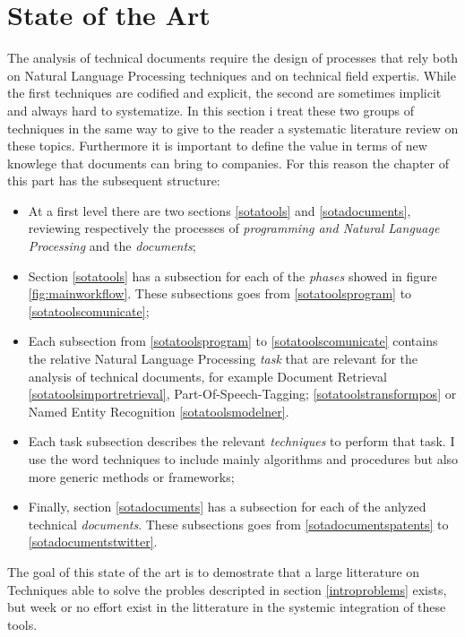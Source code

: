 \documentclass[]{book}
\begin{document}
\part{State of the Art}\label{part-state-of-the-art}

The analysis of technical documents require the design of processes that
rely both on Natural Language Processing techniques and on technical
field expertis. While the first techniques are codified and explicit,
the second are sometimes implicit and always hard to systematize. In
this section i treat these two groups of techniques in the same way to
give to the reader a systematic literature review on these topics.
Furthermore it is important to define the value in terms of new knowlege
that documents can bring to companies. For this reason the chapter of
this part has the subsequent structure:

\begin{itemize}
\item
  At a first level there are two sections \ref{sotatools} and
  \ref{sotadocuments}, reviewing respectively the processes of
  \emph{programming and Natural Language Processing} and the
  \emph{documents};
\item
  Section \ref{sotatools} has a subsection for each of the \emph{phases}
  showed in figure \ref{fig:mainworkflow}. These subsections goes from
  \ref{sotatoolsprogram} to \ref{sotatoolscomunicate};
\item
  Each subsection from \ref{sotatoolsprogram} to
  \ref{sotatoolscomunicate} contains the relative Natural Language
  Processing \emph{task} that are relevant for the analysis of technical
  documents, for example Document Retrieval
  \ref{sotatoolsimportretrieval}, Part-Of-Speech-Tagging;
  \ref{sotatoolstransformpos} or Named Entity Recognition
  \ref{sotatoolsmodelner}.
\item
  Each task subsection describes the relevant \emph{techniques} to
  perform that task. I use the word techniques to include mainly
  algorithms and procedures but also more generic methods or frameworks;
\item
  Finally, section \ref{sotadocuments} has a subsection for each of the
  anlyzed technical \emph{documents}. These subsections goes from
  \ref{sotadocumentspatents} to \ref{sotadocumentstwitter}.
\end{itemize}

The goal of this state of the art is to demostrate that a large
litterature on Techniques able to solve the probles descripted in
section \ref{introproblems} exists, but week or no effort exist in the
litterature in the systemic integration of these tools.
\end{document}

